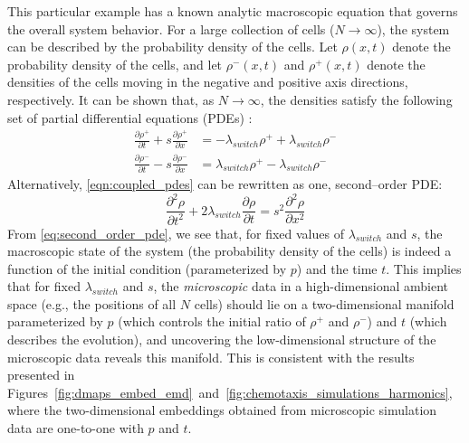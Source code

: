 This particular example has a known analytic macroscopic equation that governs the overall system behavior.
%
For a large collection of cells ($N \rightarrow \infty$), the system can be described by the probability density of the cells.
%
Let $\rho(x, t)$ denote the probability density of the cells, and let $\rho^-(x, t)$ and $\rho^+(x, t)$ denote the densities of the cells moving in the negative and positive axis directions, respectively.
%
It can be shown that, as $N \rightarrow \infty$, the densities satisfy the following set of partial differential equations (PDEs) \cite{othmer2000diffusion}:
\begin{equation} \label{eqn:coupled_pdes}
\begin{aligned}
\frac{\partial \rho^+}{\partial t} + s \frac{\partial \rho^+}{\partial x} & = -\lambda_{switch} \rho^+ +\lambda_{switch} \rho^- \\
\frac{\partial \rho^-}{\partial t} - s \frac{\partial \rho^-}{\partial x} & = \lambda_{switch} \rho^+ -\lambda_{switch} \rho^-
\end{aligned}
\end{equation}
%
Alternatively, \eqref{eqn:coupled_pdes} can be rewritten as one, second--order PDE:
\begin{equation} \label{eq:second_order_pde}
\frac{\partial^2 \rho}{\partial t^2} + 2 \lambda_{switch} \frac{\partial \rho}{\partial t} = s^2 \frac{\partial ^2 \rho}{\partial x^2}
\end{equation}
%
From \eqref{eq:second_order_pde}, we see that, for fixed values of $\lambda_{switch}$ and $s$, the macroscopic state of the system (the probability density of the cells) is indeed a function of the initial condition (parameterized by $p$) and the time $t$.
%
This implies that for fixed $\lambda_{switch}$ and $s$, the {\em microscopic} data in a high-dimensional ambient space (e.g., the positions of all $N$ cells) should lie on a two-dimensional manifold parameterized by $p$ (which controls the initial ratio of $\rho^+$ and $\rho^-$) and $t$ (which describes the evolution),
and uncovering the low-dimensional structure of the microscopic data reveals this manifold.
%
This is consistent with the results presented in Figures~\ref{fig:dmaps_embed_emd}~and~\ref{fig:chemotaxis_simulations_harmonics}, where the two-dimensional embeddings obtained from microscopic simulation data are one-to-one with $p$ and $t$.


